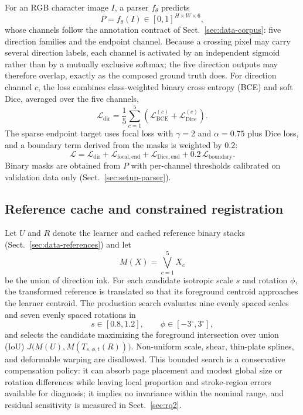For an RGB character image \(I\), a parser \(f_\theta\) predicts
\[
P=f_\theta(I)\in[0,1]^{H\times W\times 6},
\]
whose channels follow the annotation contract of
Sect.~\ref{sec:data-corpus}: five direction families and the endpoint
channel. Because a crossing pixel may carry several direction labels, each
channel is activated by an independent sigmoid rather than by a mutually
exclusive softmax; the five direction outputs may therefore overlap, exactly
as the composed ground truth does. For direction channel \(c\), the loss combines class-weighted
binary cross entropy (BCE) and soft Dice, averaged over the five channels,
\[
\mathcal{L}_{\mathrm{dir}}
=\frac{1}{5}\sum_{c=1}^{5}
\left(
\mathcal{L}_{\mathrm{BCE}}^{(c)}
+\mathcal{L}_{\mathrm{Dice}}^{(c)}
\right).
\]
The sparse endpoint target uses focal loss with \(\gamma=2\) and
\(\alpha=0.75\) plus Dice loss, and a boundary term derived from the masks is
weighted by \(0.2\):
\[
\mathcal{L}
=\mathcal{L}_{\mathrm{dir}}
+\mathcal{L}_{\mathrm{focal,end}}
+\mathcal{L}_{\mathrm{Dice,end}}
+0.2\,\mathcal{L}_{\mathrm{boundary}}.
\]
Binary masks are obtained from \(P\) with per-channel thresholds calibrated
on validation data only (Sect.~\ref{sec:setup-parser}).

\subsection{Reference cache and constrained registration}
\label{sec:alignment-method}

Let \(U\) and \(R\) denote the learner and cached reference binary stacks
(Sect.~\ref{sec:data-references}) and let
\[
M(X)=\bigvee_{c=1}^{5}X_c
\]
be the union of direction ink. For each candidate isotropic scale \(s\) and
rotation \(\phi\), the transformed reference is translated so that its
foreground centroid approaches the learner centroid. The production search
evaluates nine evenly spaced scales and seven evenly spaced rotations in
\[
s\in[0.8,1.2],\qquad \phi\in[-3^\circ,3^\circ],
\]
and selects the candidate maximizing the foreground intersection over union
(IoU) \(J\bigl(M(U),M(T_{s,\phi,t}(R))\bigr)\). Non-uniform scale, shear,
thin-plate splines, and deformable warping are disallowed. This bounded
search is a conservative compensation policy: it can absorb page placement
and modest global size or rotation differences while leaving local
proportion and stroke-region errors available for diagnosis; it implies no
invariance within the nominal range, and residual sensitivity is measured in
Sect.~\ref{sec:rq2}.


